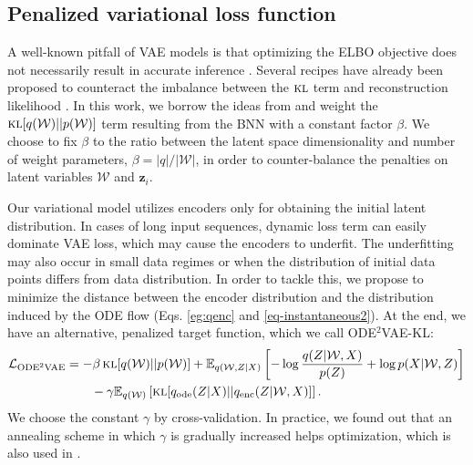 \documentclass{article}
\newcommand{\z}{\mathbf{z}}
\newcommand{\E}{\mathbb{E}}
\newcommand{\0}{\mathbf{0}}
\newcommand{\W}{\mathcal{W}}
\DeclareMathOperator{\KL}{\textsc{kl}}
\newcommand{\Lagr}{\mathcal{L}}
\begin{document}
\subsection{Penalized variational loss function}
A well-known pitfall of VAE models is that optimizing the ELBO objective does not necessarily result in accurate  inference \citep{alemi2017fixing}. Several recipes have already been proposed to counteract the imbalance between the $\KL$ term and reconstruction likelihood \citep{zhao2017infovae,higgins2017beta}. In this work, we borrow the ideas from \cite{higgins2017beta} and weight the $\KL[q(\mathcal{W}) || p(\mathcal{W})]$ term resulting from the BNN with a constant factor $\beta$. We choose to fix $\beta$ to the ratio between the latent space dimensionality and number of weight parameters, $\beta=|q|/|\W|$, in order to counter-balance the penalties on latent variables $\W$ and $\z_i$. 

Our variational model utilizes encoders only for obtaining the initial latent distribution. In cases of long input sequences, dynamic loss term can easily dominate VAE loss, which may cause the encoders to underfit. The underfitting may also occur in small data regimes or when the distribution of initial data points differs from data distribution. In order to tackle this, we propose to minimize the distance between the encoder distribution and the distribution induced by the ODE flow (Eqs. \ref{eg:qenc} and \ref{eq-instantaneous2}). At the end, we have an alternative, penalized target function, which we call ODE$^2$VAE-KL:
\begin{align}
 \Lagr_{\text{ODE}^2\text{VAE}} &= -\beta\KL[q(\mathcal{W}) || p(\mathcal{W})] + \E_{q(\mathcal{W},Z|X)} \left[- \log \frac{q(Z|\mathcal{W},X)}{p(Z)} + \log p(X|\mathcal{W},Z) \right]  \\ \notag 
 &\qquad - \gamma\E_{q(\W)} \left[\KL[q_{\text{ode}}(Z|X)||q_{\text{enc}}(Z|\W,X)]\right].
\end{align}
We choose the constant $\gamma$ by cross-validation. In practice, we found out that an annealing scheme in which $\gamma$ is gradually increased helps optimization, which is also used in \citep{karl2016deep,rezende2015variational}.
\end{document}
